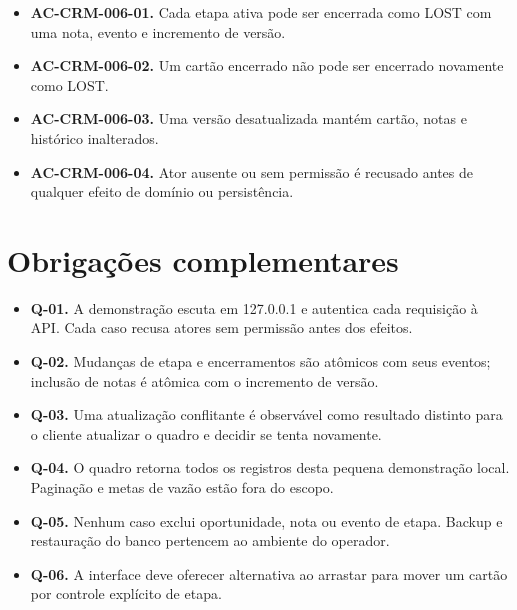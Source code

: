\documentclass[10pt,a4paper]{article}
\begin{document}
\begin{itemize}

\item \textbf{AC-CRM-006-01.} Cada etapa ativa pode ser encerrada como LOST com uma nota, evento e incremento de versão.

\item \textbf{AC-CRM-006-02.} Um cartão encerrado não pode ser encerrado novamente como LOST.

\item \textbf{AC-CRM-006-03.} Uma versão desatualizada mantém cartão, notas e histórico inalterados.

\item \textbf{AC-CRM-006-04.} Ator ausente ou sem permissão é recusado antes de qualquer efeito de domínio ou persistência.

\end{itemize}

\section{Obrigações complementares}

\begin{itemize}

\item \textbf{Q-01.} A demonstração escuta em 127.0.0.1 e autentica cada requisição à API. Cada caso recusa atores sem permissão antes dos efeitos.

\item \textbf{Q-02.} Mudanças de etapa e encerramentos são atômicos com seus eventos; inclusão de notas é atômica com o incremento de versão.

\item \textbf{Q-03.} Uma atualização conflitante é observável como resultado distinto para o cliente atualizar o quadro e decidir se tenta novamente.

\item \textbf{Q-04.} O quadro retorna todos os registros desta pequena demonstração local. Paginação e metas de vazão estão fora do escopo.

\item \textbf{Q-05.} Nenhum caso exclui oportunidade, nota ou evento de etapa. Backup e restauração do banco pertencem ao ambiente do operador.

\item \textbf{Q-06.} A interface deve oferecer alternativa ao arrastar para mover um cartão por controle explícito de etapa.

\end{itemize}
\end{document}
